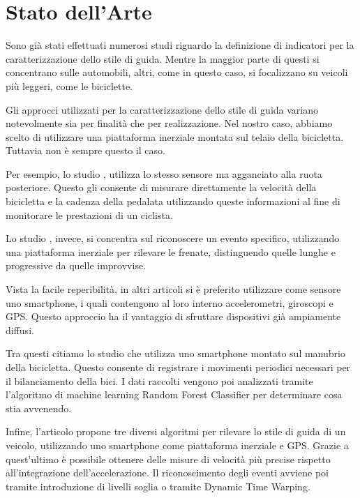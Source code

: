 \documentclass[class=article]{standalone}
\begin{document}
	\section{Stato dell'Arte}
	Sono già stati effettuati numerosi studi riguardo la definizione di indicatori per la caratterizzazione dello stile di guida.
	Mentre la maggior parte di questi si concentrano sulle automobili, altri, come in questo caso, si focalizzano su veicoli più leggeri, come le biciclette.
	
	Gli approcci utilizzati per la caratterizzazione dello stile di guida variano notevolmente sia per finalità che per realizzazione. Nel nostro caso, abbiamo scelto di utilizzare una piattaforma inerziale montata sul telaio della bicicletta. Tuttavia non è sempre questo il caso.
	
	Per esempio, lo studio \cite{ruota}, utilizza lo stesso sensore ma agganciato alla ruota posteriore. Questo gli consente di misurare direttamente la velocità della bicicletta e la cadenza della pedalata utilizzando queste informazioni al fine di monitorare le prestazioni di un ciclista.
	
	Lo studio \cite{brake}, invece, si concentra sul riconoscere un evento specifico, utilizzando una piattaforma inerziale per rilevare le frenate, distinguendo quelle lunghe e progressive da quelle improvvise.
	
	Vista la facile reperibilità, in altri articoli si è preferito utilizzare come sensore uno smartphone, i quali contengono al loro interno accelerometri, giroscopi e GPS. Questo approccio ha il vantaggio di sfruttare dispositivi già ampiamente diffusi.
	
	Tra questi citiamo lo studio \cite{transfun} che utilizza uno smartphone montato sul manubrio della bicicletta. Questo consente di registrare i movimenti periodici necessari per il bilanciamento della bici. I dati raccolti vengono poi analizzati tramite l'algoritmo di machine learning Random Forest Classifier per determinare cosa stia avvenendo.
	
	Infine, l'articolo \cite{dtwAndCo} propone tre diversi algoritmi per rilevare lo stile di guida di un veicolo, utilizzando uno smartphone come piattaforma inerziale e GPS. Grazie a quest'ultimo è possibile ottenere delle misure di velocità più precise rispetto all'integrazione dell'accelerazione. Il riconoscimento degli eventi avviene poi tramite introduzione di livelli soglia o tramite Dynamic Time Warping.
	
	
\end{document}
